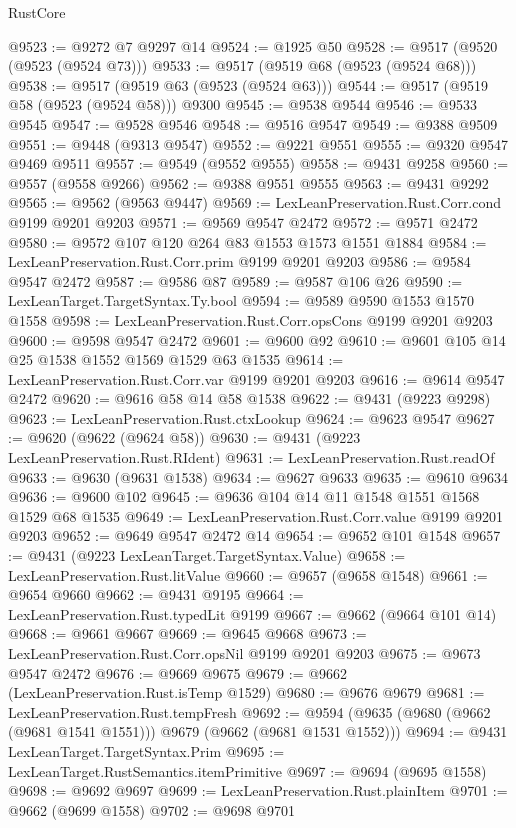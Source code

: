\begin{lexlean}{RustCore}
\begin{coremodule}
@9523 := @9272 @7 @9297 @14
@9524 := @1925 @50
@9528 := @9517 (@9520 (@9523 (@9524 @73)))
@9533 := @9517 (@9519 @68 (@9523 (@9524 @68)))
@9538 := @9517 (@9519 @63 (@9523 (@9524 @63)))
@9544 := @9517 (@9519 @58 (@9523 (@9524 @58))) @9300
@9545 := @9538 @9544
@9546 := @9533 @9545
@9547 := @9528 @9546
@9548 := @9516 @9547
@9549 := @9388 @9509
@9551 := @9448 (@9313 @9547)
@9552 := @9221 @9551
@9555 := @9320 @9547 @9469 @9511
@9557 := @9549 (@9552 @9555)
@9558 := @9431 @9258
@9560 := @9557 (@9558 @9266)
@9562 := @9388 @9551 @9555
@9563 := @9431 @9292
@9565 := @9562 (@9563 @9447)
@9569 := LexLeanPreservation.Rust.Corr.cond @9199 @9201 @9203
@9571 := @9569 @9547 @2472
@9572 := @9571 @2472
@9580 := @9572 @107 @120 @264 @83 @1553 @1573 @1551 @1884
@9584 := LexLeanPreservation.Rust.Corr.prim @9199 @9201 @9203
@9586 := @9584 @9547 @2472
@9587 := @9586 @87
@9589 := @9587 @106 @26
@9590 := LexLeanTarget.TargetSyntax.Ty.bool
@9594 := @9589 @9590 @1553 @1570 @1558
@9598 := LexLeanPreservation.Rust.Corr.opsCons @9199 @9201 @9203
@9600 := @9598 @9547 @2472
@9601 := @9600 @92
@9610 := @9601 @105 @14 @25 @1538 @1552 @1569 @1529 @63 @1535
@9614 := LexLeanPreservation.Rust.Corr.var @9199 @9201 @9203
@9616 := @9614 @9547 @2472
@9620 := @9616 @58 @14 @58 @1538
@9622 := @9431 (@9223 @9298)
@9623 := LexLeanPreservation.Rust.ctxLookup
@9624 := @9623 @9547
@9627 := @9620 (@9622 (@9624 @58))
@9630 := @9431 (@9223 LexLeanPreservation.Rust.RIdent)
@9631 := LexLeanPreservation.Rust.readOf
@9633 := @9630 (@9631 @1538)
@9634 := @9627 @9633
@9635 := @9610 @9634
@9636 := @9600 @102
@9645 := @9636 @104 @14 @11 @1548 @1551 @1568 @1529 @68 @1535
@9649 := LexLeanPreservation.Rust.Corr.value @9199 @9201 @9203
@9652 := @9649 @9547 @2472 @14
@9654 := @9652 @101 @1548
@9657 := @9431 (@9223 LexLeanTarget.TargetSyntax.Value)
@9658 := LexLeanPreservation.Rust.litValue
@9660 := @9657 (@9658 @1548)
@9661 := @9654 @9660
@9662 := @9431 @9195
@9664 := LexLeanPreservation.Rust.typedLit @9199
@9667 := @9662 (@9664 @101 @14)
@9668 := @9661 @9667
@9669 := @9645 @9668
@9673 := LexLeanPreservation.Rust.Corr.opsNil @9199 @9201 @9203
@9675 := @9673 @9547 @2472
@9676 := @9669 @9675
@9679 := @9662 (LexLeanPreservation.Rust.isTemp @1529)
@9680 := @9676 @9679
@9681 := LexLeanPreservation.Rust.tempFresh
@9692 := @9594 (@9635 (@9680 (@9662 (@9681 @1541 @1551))) @9679 (@9662 (@9681 @1531 @1552)))
@9694 := @9431 LexLeanTarget.TargetSyntax.Prim
@9695 := LexLeanTarget.RustSemantics.itemPrimitive
@9697 := @9694 (@9695 @1558)
@9698 := @9692 @9697
@9699 := LexLeanPreservation.Rust.plainItem
@9701 := @9662 (@9699 @1558)
@9702 := @9698 @9701

\end{coremodule}
\end{lexlean}
